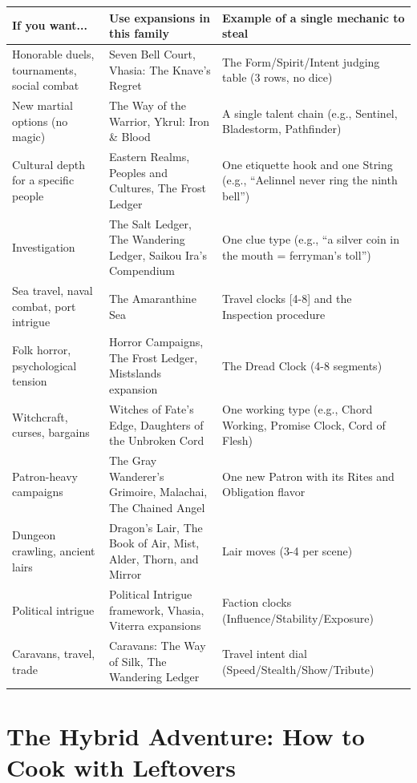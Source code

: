 \begin{longtable}{p{3.5cm}|p{3.5cm}|p{6cm}}
\hline
\textbf{If you want...} & \textbf{Use expansions in this family} & \textbf{Example of a single mechanic to steal} \\
\hline
Honorable duels, tournaments, social combat & Seven Bell Court, Vhasia: The Knave's Regret & The Form/Spirit/Intent judging table (3 rows, no dice) \\
\hline
New martial options (no magic) & The Way of the Warrior, Ykrul: Iron \& Blood & A single talent chain (e.g., Sentinel, Bladestorm, Pathfinder) \\
\hline
Cultural depth for a specific people & Eastern Realms, Peoples and Cultures, The Frost Ledger & One etiquette hook and one String (e.g., “Aelinnel never ring the ninth bell”) \\
\hline
Investigation & The Salt Ledger, The Wandering Ledger, Saikou Ira's Compendium & One clue type (e.g., “a silver coin in the mouth = ferryman's toll”) \\
\hline
Sea travel, naval combat, port intrigue & The Amaranthine Sea & Travel clocks [4-8] and the Inspection procedure \\
\hline
Folk horror, psychological tension & Horror Campaigns, The Frost Ledger, Mistslands expansion & The Dread Clock (4-8 segments) \\
\hline
Witchcraft, curses, bargains & Witches of Fate's Edge, Daughters of the Unbroken Cord & One working type (e.g., Chord Working, Promise Clock, Cord of Flesh) \\
\hline
Patron-heavy campaigns & The Gray Wanderer's Grimoire, Malachai, The Chained Angel & One new Patron with its Rites and Obligation flavor \\
\hline
Dungeon crawling, ancient lairs & Dragon's Lair, The Book of Air, Mist, Alder, Thorn, and Mirror & Lair moves (3-4 per scene) \\
\hline
Political intrigue & Political Intrigue framework, Vhasia, Viterra expansions & Faction clocks (Influence/Stability/Exposure) \\
\hline
Caravans, travel, trade & Caravans: The Way of Silk, The Wandering Ledger & Travel intent dial (Speed/Stealth/Show/Tribute) \\
\hline
\end{longtable}

\section{The Hybrid Adventure: How to Cook with Leftovers}

